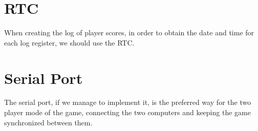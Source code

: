 \documentclass[11pt,a4paper,reqno]{report}
\numberwithin{equation}{section}
\begin{document}
\section{RTC}

When creating the log of player scores, in order to obtain the date and time for each log register, we should use the RTC.

\section{Serial Port}

The serial port, if we manage to implement it, is the preferred way for the two player mode of the game, connecting the two computers and keeping the game synchronized between them.
\end{document}
